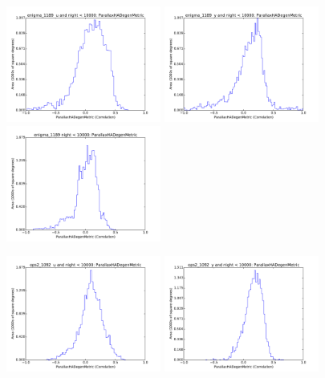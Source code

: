 \begin{figure}[ht]
  \begin{center}
  \includegraphics[width=2.0in]{./figs/milkyway/MW_Astrom_paDegen_1189_u_hst.pdf}
  \includegraphics[width=2.0in]{./figs/milkyway/MW_Astrom_paDegen_1189_y_hst.pdf}
  \includegraphics[width=2.0in]{./figs/milkyway/MW_Astrom_paDegen_1189_10y_hst.pdf}
  \end{center}
  \begin{center}
  \includegraphics[width=2.0in]{./figs/milkyway/MW_Astrom_paDegen_1092_u_hst.pdf}
  \includegraphics[width=2.0in]{./figs/milkyway/MW_Astrom_paDegen_1092_y_hst.pdf}

\end{center}
\end{figure}
